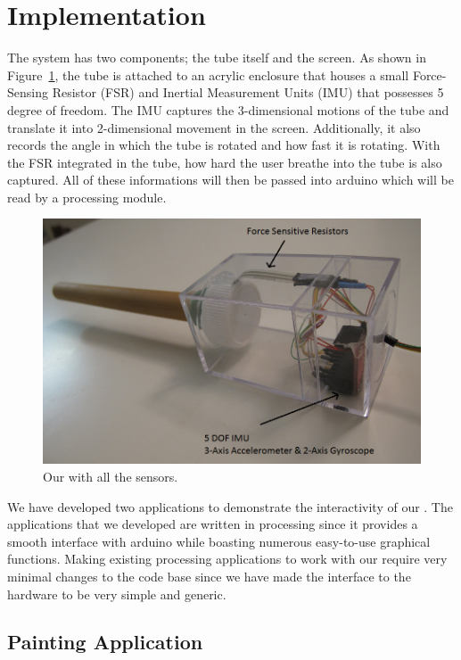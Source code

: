 \section{Implementation}\label{sec:impl}

The \tube system has two components; the tube itself and the screen. As shown in Figure~\ref{fig:impl1}, the tube is attached to an acrylic enclosure that houses a small Force-Sensing Resistor (FSR) and Inertial Measurement Units (IMU) that possesses 5 degree of freedom. The IMU captures the 3-dimensional motions of the tube and translate it into 2-dimensional movement in the screen. Additionally, it also records the angle in which the tube is rotated and how fast it is rotating. With the FSR integrated in the tube, how hard the user breathe into the tube is also captured. All of these informations will then be passed into arduino which will be read by a processing module.

\begin{figure}
  \centering
  \includegraphics[width=\linewidth]{./figs/impl1.png}
  \caption{Our \tube with all the sensors.}
  \label{fig:impl1}
\end{figure}


We have developed two applications to demonstrate the interactivity of our \tube. The applications that we developed are written in processing since it provides a smooth interface with arduino while boasting numerous easy-to-use graphical functions. Making existing processing applications to work with our \tube require very minimal changes to the code base since we have made the interface to the hardware to be very simple and generic.

\subsection{\textbf{Painting Application}}

